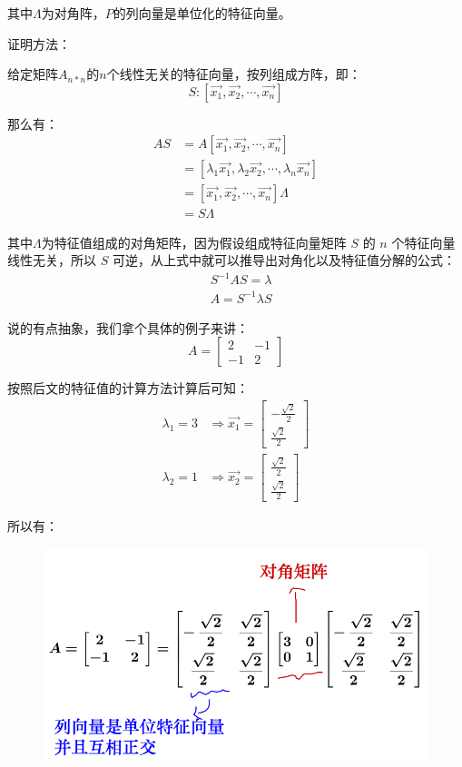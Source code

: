 \documentclass[12pt]{article}
\begin{document}
其中$\Lambda$为对角阵，$P$的列向量是单位化的特征向量。

\begin{framed}  
\small{
证明方法：

给定矩阵$A_{n*n}$的$n$个线性无关的特征向量，按列组成方阵，即：
$$
S: [\vec{x_1}, \vec{x_2}, \cdots, \vec{x_n}]
$$

那么有：
\begin{align*}
    AS &= A[\vec{x_1}, \vec{x_2}, \cdots, \vec{x_n}] \\
    &= [\lambda_1\vec{x_1}, \lambda_2\vec{x_2}, \cdots, \lambda_n\vec{x_n}] \\
    &= [\vec{x_1}, \vec{x_2}, \cdots, \vec{x_n}] \Lambda \\
    &= S\Lambda
\end{align*}

其中$\Lambda$为特征值组成的对角矩阵，因为假设组成特征向量矩阵 $S$ 的 $n$ 个特征向量线性无关，所以 $S$ 可逆，从上式中就可以推导出对角化以及特征值分解的公式：
\begin{align*}
    &S^{-1}AS = \lambda \\
    &A = S^{-1}\lambda S
\end{align*}
}
\end{framed}

说的有点抽象，我们拿个具体的例子来讲：
$$
A= \begin{bmatrix}
2&-1\\-1&2
\end{bmatrix}
$$

按照后文的特征值的计算方法计算后可知：
\begin{align*}
    \lambda_1 = 3 &\Rightarrow \vec{x_1} = \begin{bmatrix}
    -\frac{\sqrt{2}}{2} \\ \frac{\sqrt{2}}{2}
    \end{bmatrix} \\
    \lambda_2 = 1 &\Rightarrow \vec{x_2} = \begin{bmatrix}
    \frac{\sqrt{2}}{2} \\ \frac{\sqrt{2}}{2}
    \end{bmatrix}
\end{align*}

所以有：
\begin{figure}[H]
    \centering
    \includegraphics[width=.5\textwidth]{fig/UnderstandEigenValueVector_9.png}
\end{figure} 
\end{document}
